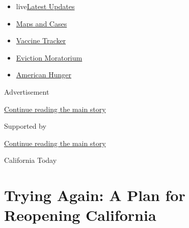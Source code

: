 \begin{itemize}
\tightlist
\item
  live\href{https://www.nytimes3xbfgragh.onion/2020/09/08/world/covid-19-coronavirus.html?name=styln-coronavirus-national\&region=TOP_BANNER\&block=storyline_menu_recirc\&action=click\&pgtype=Article\&impression_id=fcced741-f279-11ea-b9bc-3185cbd6b8a2\&variant=undefined}{Latest
  Updates}
\item
  \href{https://www.nytimes3xbfgragh.onion/interactive/2020/us/coronavirus-us-cases.html?name=styln-coronavirus-national\&region=TOP_BANNER\&block=storyline_menu_recirc\&action=click\&pgtype=Article\&impression_id=fcced742-f279-11ea-b9bc-3185cbd6b8a2\&variant=undefined}{Maps
  and Cases}
\item
  \href{https://www.nytimes3xbfgragh.onion/interactive/2020/science/coronavirus-vaccine-tracker.html?name=styln-coronavirus-national\&region=TOP_BANNER\&block=storyline_menu_recirc\&action=click\&pgtype=Article\&impression_id=fcced743-f279-11ea-b9bc-3185cbd6b8a2\&variant=undefined}{Vaccine
  Tracker}
\item
  \href{https://www.nytimes3xbfgragh.onion/2020/09/02/your-money/eviction-moratorium-covid.html?name=styln-coronavirus-national\&region=TOP_BANNER\&block=storyline_menu_recirc\&action=click\&pgtype=Article\&impression_id=fcced744-f279-11ea-b9bc-3185cbd6b8a2\&variant=undefined}{Eviction
  Moratorium}
\item
  \href{https://www.nytimes3xbfgragh.onion/interactive/2020/09/02/magazine/food-insecurity-hunger-us.html?name=styln-coronavirus-national\&region=TOP_BANNER\&block=storyline_menu_recirc\&action=click\&pgtype=Article\&impression_id=fcced745-f279-11ea-b9bc-3185cbd6b8a2\&variant=undefined}{American
  Hunger}
\end{itemize}

Advertisement

\protect\hyperlink{after-top}{Continue reading the main story}

Supported by

\protect\hyperlink{after-sponsor}{Continue reading the main story}

California Today

\hypertarget{trying-again-a-plan-for-reopening-california}{%
\section{Trying Again: A Plan for Reopening
California}\label{trying-again-a-plan-for-reopening-california}}

